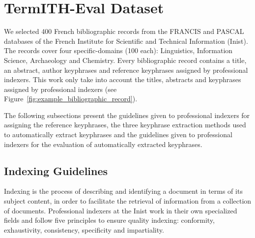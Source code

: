 \section{TermITH-Eval Dataset}
\label{sec:termith_eval_dataset}
    We selected 400 French bibliographic records from the FRANCIS and PASCAL databases of the French Institute for Scientific and Technical Information (Inist).
    The records cover four specific-domains (100 each): Linguistics, Information Science, Archaeology and Chemistry.
    Every bibliographic record contains a title, an abstract, author keyphrases and reference keyphrases assigned by professional indexers.
    This work only take into account the titles, abstracts and keyphrases assigned by professional indexers (see Figure~\ref{fig:example_bibliographic_record}).
    \begin{figure*}
      \caption{
        Example of the content of a bibliographic record
        \label{fig:example_bibliographic_record}
      }
    \end{figure*}


    The following subsections present the guidelines given to professional indexers for assigning the reference keyphrases, the three keyphrase extraction methods used to automatically extract keyphrases and the guidelines given to professional indexers for the evaluation of automatically extracted keyphrases.

    \subsection{Indexing Guidelines}
    \label{subsec:annotation_guidelines}
        Indexing is the process of describing and identifying a document in terms of its subject content, in order to facilitate the retrieval of information from a collection of documents.
        Professional indexers at the Inist work in their own specialized fields and follow five principles to ensure quality indexing: conformity, exhaustivity, consistency, specificity and impartiality.

